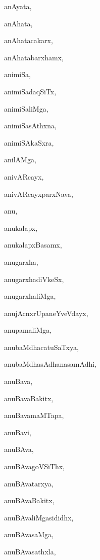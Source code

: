 \begin{multicols}{2}
{anAyata}, \pageref{anAyata}

{anAhata}, \pageref{anAhata}

{anAhatacakarx}, \pageref{anAhatacakarx}

{anAhatabarxhamx}, \pageref{anAhatabarxhamx}

{animiSa}, \pageref{animiSa}

{animiSadaqSiTx}, \pageref{animiSadaqSiTx}

{animiSaliMga}, \pageref{animiSaliMga}

{animiSasAthxna}, \pageref{animiSasAthxna}

{animiSAkaSxra}, \pageref{animiSAkaSxra}

{anilAMga}, \pageref{anilAMga}

{anivARcayx}, \pageref{anivARcayx}

{anivARcayxparxNava}, \pageref{anivARcayxparxNava}

{anu}, \pageref{anu}

{anukalapx}, \pageref{anukalapx}

{anukalapxBasamx}, \pageref{anukalapxBasamx}

{anugarxha}, \pageref{anugarxha}

{anugarxhadiVkeSx}, \pageref{anugarxhadiVkeSx}

{anugarxhaliMga}, \pageref{anugarxhaliMga}

{anujAcnxrUpaneYveVdayx}, \pageref{anujAcnxrUpaneYveVdayx}

{anupamaliMga}, \pageref{anupamaliMga}

{anubaMdhacatuSaTxya}, \pageref{anubaMdhacatuSaTxya}

{anubaMdhasAdhanasamAdhi}, \pageref{anubaMdhasAdhanasamAdhi}

{anuBava}, \pageref{anuBava}

{anuBavaBakitx}, \pageref{anuBavaBakitx}

{anuBavamaMTapa}, \pageref{anuBavamaMTapa}

{anuBavi}, \pageref{anuBavi}

{anuBAva}, \pageref{anuBAva}

{anuBAvagoVSiThx}, \pageref{anuBAvagoVSiThx}

{anuBAvatarxya}, \pageref{anuBAvatarxya}

{anuBAvaBakitx}, \pageref{anuBAvaBakitx}

{anuBAvaliMgasididhx}, \pageref{anuBAvaliMgasididhx}

{anuBAvasaMga}, \pageref{anuBAvasaMga}

{anuBAvasathxla}, \pageref{anuBAvasathxla}


\end{multicols}
